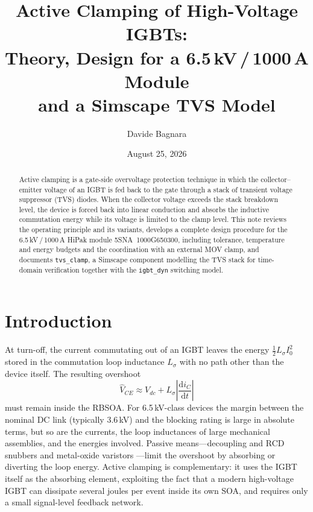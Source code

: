 \documentclass[11pt,a4paper]{article}
\title{Active Clamping of High-Voltage IGBTs:\\
Theory, Design for a 6.5\,kV\,/\,1000\,A Module\\
and a Simscape TVS Model}
\author{Davide Bagnara}
\date{August 25, 2026}
\newcommand{\ud}{\mathrm{d}}
\begin{document}
\maketitle

\begin{abstract}
Active clamping is a gate-side overvoltage protection technique in which
the collector--emitter voltage of an IGBT is fed back to the gate through
a stack of transient voltage suppressor (TVS) diodes. When the collector
voltage exceeds the stack breakdown level, the device is forced back into
linear conduction and absorbs the inductive commutation energy while its
voltage is limited to the clamp level. This note reviews the operating
principle and its variants, develops a complete design procedure for the
6.5\,kV\,/\,1000\,A HiPak module 5SNA~1000G650300, including tolerance,
temperature and energy budgets and the coordination with an external MOV
clamp, and documents \texttt{tvs\_clamp}, a Simscape component modelling
the TVS stack for time-domain verification together with the
\texttt{igbt\_dyn} switching model.
\end{abstract}

\tableofcontents

\section{Introduction}

At turn-off, the current commutating out of an IGBT leaves the energy
$\tfrac{1}{2}L_\sigma I_0^2$ stored in the commutation loop inductance
$L_\sigma$ with no path other than the device itself. The resulting
overshoot
%
\begin{equation}
  \hat{V}_{CE} \approx V_{dc} + L_\sigma \left|\frac{\ud i_C}{\ud t}\right|
  \label{eq:overshoot}
\end{equation}
%
must remain inside the RBSOA. For 6.5\,kV-class devices the margin
between the nominal DC link (typically 3.6\,kV) and the blocking rating
is large in absolute terms, but so are the currents, the loop
inductances of large mechanical assemblies, and the energies involved.
Passive means---decoupling and RCD snubbers \cite{snubdes,snubpar} and
metal-oxide varistors \cite{movnote}---limit the overshoot by absorbing
or diverting the loop energy. Active clamping is complementary: it uses
the IGBT itself as the absorbing element, exploiting the fact that a
modern high-voltage IGBT can dissipate several joules per event inside
its own SOA, and requires only a small signal-level feedback network.
\end{document}
